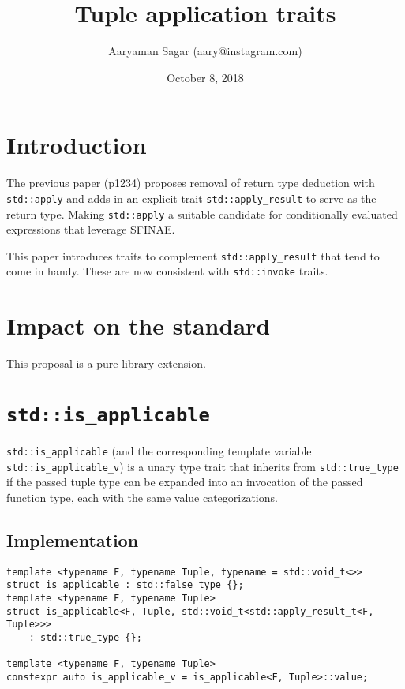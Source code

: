 \documentclass{article}
\begin{document}
\title{\textbf{Tuple application traits}}
\author{Aaryaman Sagar (aary@instagram.com)}
\date{October 8, 2018}
\maketitle

\section{Introduction}

The previous paper (p1234) proposes removal of return type deduction with
\texttt{std::apply} and adds in an explicit trait \texttt{std::apply\_result}
to serve as the return type.  Making \texttt{std::apply} a suitable candidate
for conditionally evaluated expressions that leverage SFINAE.

This paper introduces traits to complement \texttt{std::apply\_result} that
tend to come in handy.  These are now consistent with \texttt{std::invoke}
traits.

\section{Impact on the standard}
This proposal is a pure library extension.

\section{\texttt{std::is\_applicable}}
\texttt{std::is\_applicable} (and the corresponding template variable
\texttt{std::is\_applicable\_v}) is a unary type trait that inherits from
\texttt{std::true\_type} if the passed tuple type can be expanded into an
invocation of the passed function type, each with the same value
categorizations.

\subsection{Implementation}
\begin{lstlisting}
template <typename F, typename Tuple, typename = std::void_t<>>
struct is_applicable : std::false_type {};
template <typename F, typename Tuple>
struct is_applicable<F, Tuple, std::void_t<std::apply_result_t<F, Tuple>>>
    : std::true_type {};

template <typename F, typename Tuple>
constexpr auto is_applicable_v = is_applicable<F, Tuple>::value;
\end{lstlisting}
\end{document}
